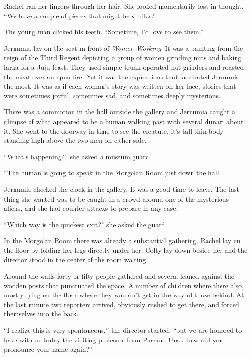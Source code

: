 Rachel ran her fingers through her hair. She looked momentarily lost in thought. ``We have a
couple of pieces that might be similar.''

The young man clicked his teeth. ``Sometime, I'd love to see them.''

\spacebreak

Jernumia lay on the seat in front of \textit{Women Working}. It was a painting from the reign of
the Third Regent depicting a group of women grinding nuts and baking larka for a Juju feast.
They used simple trunk-operated nut grinders and roasted the meat over an open fire. Yet it was
the expressions that fascinated Jernumia the most. It was as if each woman's story was written
on her face, stories that were sometimes joyful, sometimes sad, and sometimes deeply mysterious.

There was a commotion in the hall outside the gallery and Jernumia caught a glimpse of what
appeared to be a human walking past with several dunari about it. She went to the doorway in
time to see the creature, it's tall thin body standing high above the two men on either side.

``What's happening?'' she asked a museum guard.

``The human is going to speak in the Morgolan Room just down the hall.''

Jernumia checked the clock in the gallery. It was a good time to leave. The last thing she
wanted was to be caught in a crowd around one of the mysterious aliens, and she had
counter-attacks to prepare in any case.

``Which way is the quickest exit?'' she asked the guard.

In the Morgolan Room there was already a substantial gathering. Rachel lay on the floor by
folding her legs directly under her. Colty lay down beside her and the director stood in the
center of the room waiting.

Around the walls forty or fifty people gathered and several leaned against the wooden posts that
punctuated the space. A number of children where there also, mostly lying on the floor where
they wouldn't get in the way of those behind. At the last minute two reporters arrived,
obviously rushed to get there, and forced themselves into the back.

``I realize this is very spontaneous,'' the director started, ``but we are honored to have
with us today the visiting professor from Parnon. Um\ldots\ how did you pronounce your name
again?''

